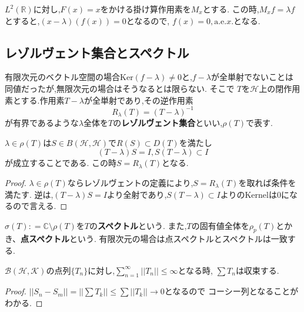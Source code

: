 \documentclass[uplatex]{jsbook}
\begin{document}
\begin{epl}
$L^2(\mathbb{R})$に対し,$F(x) = x$をかける掛け算作用素を$M_x$とする.
この時,$M_xf = \lambda f$とすると,$(x - \lambda)(f(x)) = 0$となるので,
$f(x) = 0, \mathrm{a.e.}x.$となる.
\end{epl}

\subsection{レゾルヴェント集合とスペクトル}

有限次元のベクトル空間の場合$\mathrm{Ker}(f - \lambda) \neq 0$と,$f - \lambda$が全単射でないことは同値だったが,無限次元の場合はそうなるとは限らない.
そこで
$T$を$\mathcal{H}$上の閉作用素とする.作用素$T - \lambda$が全単射であり,その逆作用素
\begin{equation*}
  R_{\lambda}(T) = (T - \lambda)^{-1}
\end{equation*}
  が有界であるような$\lambda$全体を$T$の\textbf{レゾルヴェント集合}といい,$\rho(T)$で表す.

\begin{prop}
 $\lambda \in \rho(T)$は$S \in B(\mathcal{H}, \mathcal{H})$で$R(S) \subset D(T)$を満たし
 \begin{equation*}
   (T - \lambda) S = I, S(T - \lambda) \subset  I
 \end{equation*}
が成立することである. この時$S = R_{\lambda}(T)$となる.
\end{prop}
\begin{proof}
$\lambda \in \rho(T)$ならレゾルヴェントの定義により,$S = R_{\lambda}(T)$を取れば条件を満たす.
逆は,$(T - \lambda )S = I$より全射であり,$S(T - \lambda) \subset I$よりのKernelは0になるので言える.
\end{proof}

$\sigma(T): = \mathbb{C} \setminus \rho(T)$を$T$の\textbf{スペクトル}という.
また,$T$の固有値全体を$\rho_p(T)$とかき、\textbf{点スペクトル}という.
有限次元の場合は点スペクトルとスペクトルは一致する.

\begin{prop}
 $\mathcal{B} (\mathcal{H}, \mathcal{K})$の点列$\{T_n\}$に対し,$\sum_{n=1}^{\infty}||T_n|| \le \infty$となる時,
 $\sum T_n$は収束する.
\end{prop}
\begin{proof}
$||S_n - S_m|| =|| \sum T_k|| \le \sum ||T_k|| \to 0$となるので
コーシー列となることがわかる.
\end{proof}
\end{document}
